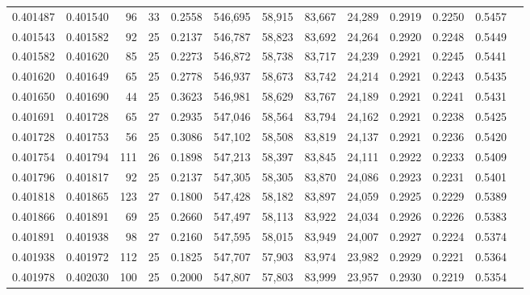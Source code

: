 \begin{tabular}{rrrrrrrrrrrrr}
0.401487 & 0.401540 &    96 &  33 &                                     0.2558 & 546,695 &  58,915 &  83,667 &  24,289 & 0.2919 & 0.2250 & 0.5457 \\
0.401543 & 0.401582 &    92 &  25 &                                     0.2137 & 546,787 &  58,823 &  83,692 &  24,264 & 0.2920 & 0.2248 & 0.5449 \\
0.401582 & 0.401620 &    85 &  25 &                                     0.2273 & 546,872 &  58,738 &  83,717 &  24,239 & 0.2921 & 0.2245 & 0.5441 \\
0.401620 & 0.401649 &    65 &  25 &                                     0.2778 & 546,937 &  58,673 &  83,742 &  24,214 & 0.2921 & 0.2243 & 0.5435 \\
0.401650 & 0.401690 &    44 &  25 &                                     0.3623 & 546,981 &  58,629 &  83,767 &  24,189 & 0.2921 & 0.2241 & 0.5431 \\
0.401691 & 0.401728 &    65 &  27 &                                     0.2935 & 547,046 &  58,564 &  83,794 &  24,162 & 0.2921 & 0.2238 & 0.5425 \\
0.401728 & 0.401753 &    56 &  25 &                                     0.3086 & 547,102 &  58,508 &  83,819 &  24,137 & 0.2921 & 0.2236 & 0.5420 \\
0.401754 & 0.401794 &   111 &  26 &                                     0.1898 & 547,213 &  58,397 &  83,845 &  24,111 & 0.2922 & 0.2233 & 0.5409 \\
0.401796 & 0.401817 &    92 &  25 &                                     0.2137 & 547,305 &  58,305 &  83,870 &  24,086 & 0.2923 & 0.2231 & 0.5401 \\
0.401818 & 0.401865 &   123 &  27 &                                     0.1800 & 547,428 &  58,182 &  83,897 &  24,059 & 0.2925 & 0.2229 & 0.5389 \\
0.401866 & 0.401891 &    69 &  25 &                                     0.2660 & 547,497 &  58,113 &  83,922 &  24,034 & 0.2926 & 0.2226 & 0.5383 \\
0.401891 & 0.401938 &    98 &  27 &                                     0.2160 & 547,595 &  58,015 &  83,949 &  24,007 & 0.2927 & 0.2224 & 0.5374 \\
0.401938 & 0.401972 &   112 &  25 &                                     0.1825 & 547,707 &  57,903 &  83,974 &  23,982 & 0.2929 & 0.2221 & 0.5364 \\
0.401978 & 0.402030 &   100 &  25 &                                     0.2000 & 547,807 &  57,803 &  83,999 &  23,957 & 0.2930 & 0.2219 & 0.5354 \\

\end{tabular}
